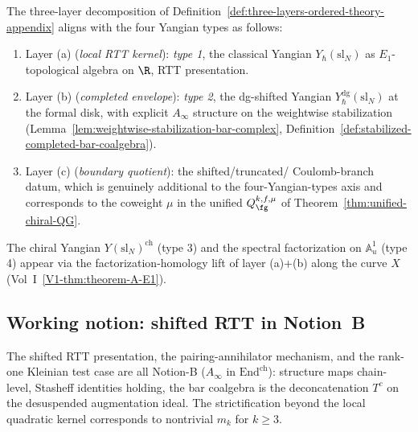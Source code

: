 \begin{convention}
\label{conv:shifted-rtt-yangian-types}
The three-layer decomposition of
Definition~\ref{def:three-layers-ordered-theory-appendix} aligns
with the four Yangian types as follows:
\begin{enumerate}[label=\textup{(\arabic*)}]
\item Layer (a) (\emph{local RTT kernel}): \emph{type 1},
the classical Yangian $Y_\hbar(\mathrm{sl}_N)$ as
$E_1$-topological algebra on $\R$, RTT presentation.
\item Layer (b) (\emph{completed envelope}): \emph{type 2},
the dg-shifted Yangian $Y^{\mathrm{dg}}_\hbar(\mathrm{sl}_N)$ at
the formal disk, with explicit $A_\infty$ structure on the
weightwise stabilization (Lemma~\ref{lem:weightwise-stabilization-bar-complex}, Definition~\ref{def:stabilized-completed-bar-coalgebra}).
\item Layer (c) (\emph{boundary quotient}): the shifted/truncated/
Coulomb-branch datum, which is genuinely additional to the
four-Yangian-types axis and corresponds to the coweight $\mu$
in the unified $Q_\fg^{k,f,\mu}$ of
Theorem~\ref{thm:unified-chiral-QG}.
\end{enumerate}
The chiral Yangian $Y(\mathrm{sl}_N)^{\mathrm{ch}}$ (type 3) and the
spectral factorization on $\mathbb{A}^1_u$ (type 4) appear via the
factorization-homology lift of layer (a)+(b) along the curve $X$
(Vol~I~\cref{V1-thm:theorem-A-E1}).
\end{convention}

\subsection{Working notion: shifted RTT in Notion~B}
\label{subsec:shifted-rtt-notion-b}

\begin{convention}
\label{conv:shifted-rtt-notion-b}
The shifted RTT presentation, the pairing-annihilator mechanism,
and the rank-one Kleinian test case are all Notion-B
($A_\infty$ in $\mathrm{End}^{\mathrm{ch}}$): structure maps
chain-level, Stasheff identities holding, the bar coalgebra is
the deconcatenation $T^c$ on the desuspended augmentation ideal.
The strictification beyond the local quadratic kernel
corresponds to nontrivial $m_k$ for $k\ge 3$.
\end{convention}

